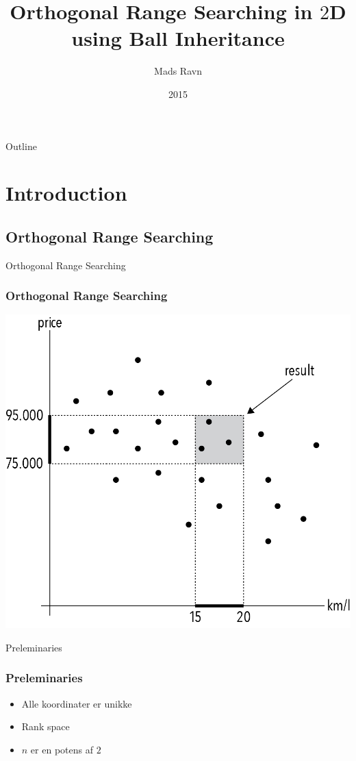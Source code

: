 \documentclass[pdf]{beamer}
\title{Orthogonal Range Searching in $2$D\\ using Ball Inheritance}
\author{Mads Ravn}
\institute{Computer Science, Aarhus University}
\date{2015}
\begin{document}
\begin{frame}
  \titlepage
\end{frame}

\begin{frame}{Outline}
  \tableofcontents
\end{frame}

\section{Introduction}
\subsection{Orthogonal Range Searching}

\begin{frame}{Orthogonal Range Searching}
  \frametitle{Orthogonal Range Searching}
  \begin{center}
    \includegraphics{pictures/introduction.png}
  \end{center}
\end{frame}

\begin{frame}{Preleminaries}
  \frametitle{Preleminaries}
  \begin{itemize}
    \item Alle koordinater er unikke
    \item Rank space
    \item $n$ er en potens af $2$
  \end{itemize}
\end{frame}
\end{document}

